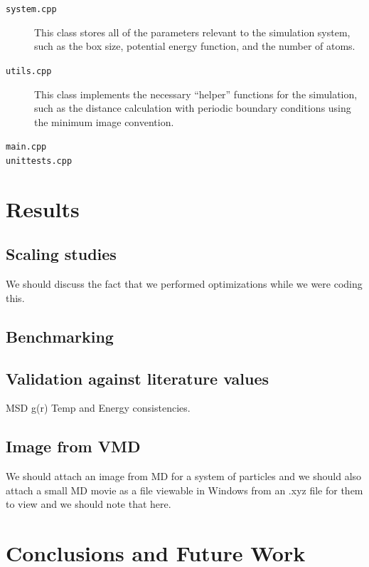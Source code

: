 \documentclass[12pt]{article}
\begin{document}
\begin{description}
\item[\texttt{system.cpp}] This class stores all of the parameters relevant to the simulation system, such as the box size, potential energy function, and the number of atoms.

\item[\texttt{utils.cpp}] This class implements the necessary ``helper'' functions for the simulation, such as the distance calculation with periodic boundary conditions using the minimum image convention.

\item[\texttt{main.cpp}]

\item[\texttt{unittests.cpp}]

\end{description}
\section{Results}

\subsection{Scaling studies}

We should discuss the fact that we performed optimizations while we were coding this.

\subsection{Benchmarking}

\subsection{Validation against literature values}

MSD
g(r)
Temp and Energy consistencies.
\subsection{Image from VMD}
We should attach an image from MD for a system of particles and we should also attach a small MD movie as a file viewable in Windows from an .xyz file for them to view and we should note that here.
\section{Conclusions and Future Work}

\pagebreak


\end{document}
